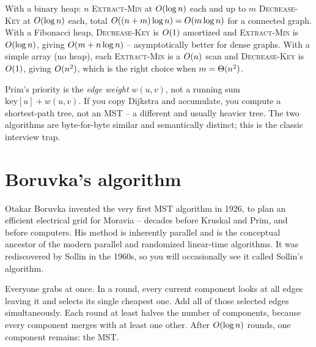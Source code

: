 \begin{complexitybox}
With a binary heap: $n$ \textsc{Extract-Min} at $O(\log n)$ each and up to $m$ \textsc{Decrease-Key} at $O(\log n)$ each, total $O((n+m)\log n)=O(m\log n)$ for a connected graph. With a Fibonacci heap, \textsc{Decrease-Key} is $O(1)$ amortized and \textsc{Extract-Min} is $O(\log n)$, giving $O(m+n\log n)$ -- asymptotically better for dense graphs. With a simple array (no heap), each \textsc{Extract-Min} is a $O(n)$ scan and \textsc{Decrease-Key} is $O(1)$, giving $O(n^2)$, which is the right choice when $m=\Theta(n^2)$.
\end{complexitybox}

\begin{trapbox}
Prim's priority is the \emph{edge weight} $w(u,v)$, not a running sum $\mathrm{key}[u]+w(u,v)$. If you copy Dijkstra and accumulate, you compute a shortest-path tree, not an MST -- a different and usually heavier tree. The two algorithms are byte-for-byte similar and semantically distinct; this is the classic interview trap.
\end{trapbox}

\section{Boruvka's algorithm}

\begin{historybox}
Otakar Boruvka invented the very first MST algorithm in 1926, to plan an efficient electrical grid for Moravia -- decades before Kruskal and Prim, and before computers. His method is inherently parallel and is the conceptual ancestor of the modern parallel and randomized linear-time algorithms. It was rediscovered by Sollin in the 1960s, so you will occasionally see it called Sollin's algorithm.
\end{historybox}

\begin{intuitionbox}
Everyone grabs at once. In a round, every current component looks at all edges leaving it and selects its single cheapest one. Add all of those selected edges simultaneously. Each round at least halves the number of components, because every component merges with at least one other. After $O(\log n)$ rounds, one component remains: the MST.
\end{intuitionbox}

